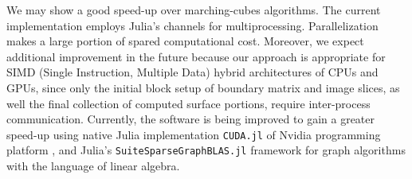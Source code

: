 \documentclass{article}
\begin{document}
We may show a good speed-up over marching-cubes algorithms. 
The current implementation employs Julia's channels
for multiprocessing. 
Parallelization makes a large portion of spared computational cost. 
%
Moreover, we expect additional improvement in the future because our approach is appropriate  for SIMD (Single Instruction, Multiple Data) hybrid architectures of CPUs and GPUs, since only the initial block setup of boundary matrix and image slices, as well the final collection of computed surface portions, require inter-process communication. 
Currently, the software is being improved to gain a greater
speed-up using native Julia implementation \texttt{CUDA.jl} of Nvidia programming platform 
\cite{Besard2019}, and Julia's
\texttt{SuiteSparseGraphBLAS.jl} framework 
\cite{Buluc2017}
for graph algorithms with the language of linear algebra. 







 


\end{document}
